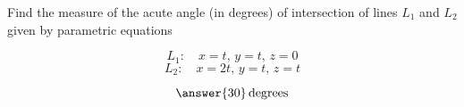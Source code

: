 \documentclass{ximera}
\author{Anna Davis}
\begin{document}
\begin{exercise}
Find the measure of the acute angle (in degrees) of intersection of lines $L_1$ and $L_2$ given by parametric equations

$$L_1:\quad x=t,\,y=t,\,z=0$$
$$L_2:\quad x=2t,\,y=t,\,z=t$$

$$\answer{30}\, \mbox{degrees}$$
 
\end{exercise}
\end{document}

